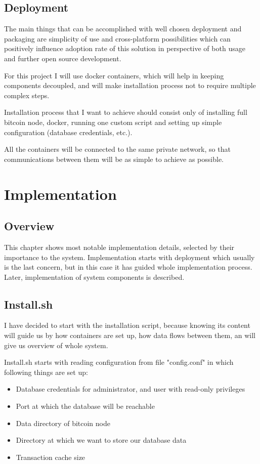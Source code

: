 \documentclass[12pt, en, eng, oneside]{mgr}
\begin{document}
\section{Deployment}

The main things that can be accomplished with well chosen deployment and packaging are simplicity of use and cross-platform possibilities which can positively influence adoption rate of this solution in perspective of both usage and further open source development.

For this project I will use docker containers, which will help in keeping components decoupled, and will make installation process not to require multiple complex steps. 

Installation process that I want to achieve should consist only of installing full bitcoin node, docker, running one custom script and setting up simple configuration (database credentials, etc.).

All the containers will be connected to the same private network, so that communications between them will be as simple to achieve as possible.

\chapter{Implementation}

\section{Overview}
This chapter shows most notable implementation details, selected by their importance to the system. Implementation starts with deployment which usually is the last concern, but in this case it has guided whole implementation process. Later, implementation of system components is described.

\section{Install.sh}
I have decided to start with the installation script, because knowing its content will guide us by how containers are set up, how data flows between them, an will give us overview of whole system.

Install.sh starts with reading configuration from file "config.conf" in which following things are set up:

\begin{itemize}
\item
Database credentials for administrator, and user with read-only privileges
\item
Port at which the database will be reachable
\item
Data directory of bitcoin node
\item
Directory at which we want to store our database data
\item
Transaction cache size
\end{itemize} 
\end{document}
